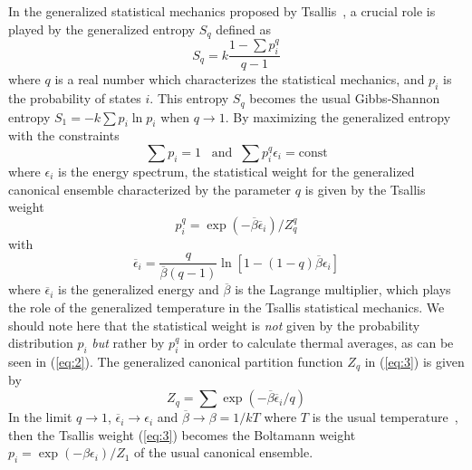 In the generalized statistical mechanics proposed by 
Tsallis~\cite{Ts}, a crucial role is played by the generalized 
entropy $S_{q}$ defined as 
\begin{equation}
S_{q}=k\frac{1-\sum p_{i}^{q}}{q-1}
\label{eq:1}
\end{equation}
where $q$ is a real number which characterizes the statistical 
mechanics, and $p_{i}$ is the probability of states $i$. This 
entropy $S_{q}$ becomes the usual Gibbs-Shannon entropy
$S_{1}=-k\sum p_{i}\ln p_{i}$ when $q\rightarrow 1$. By 
maximizing the generalized entropy with the constraints 
\begin{equation}
\sum p_{i}=1\;\;\;\mbox{and}\;\; \sum p_{i}^{q}\epsilon_{i}=\mbox{const} 
\label{eq:2}
\end{equation}
where $\epsilon_{i}$ is the energy spectrum, the statistical weight 
for the generalized canonical ensemble characterized by the 
parameter $q$ is given by the Tsallis weight
\begin{equation}
p_{i}^{q}=\exp\left(-\overline{\beta}\overline{\epsilon}_{i}\right)/Z_{q}^{q} 
\label{eq:3}
\end{equation}
with
\begin{equation}
\overline{\epsilon}_{i}=\frac{q}{\overline{\beta}(q-1)}
\ln\left[1-(1-q)\overline{\beta}\epsilon_{i }\right]
\label{eq:4}
\end{equation}
where $\overline{\epsilon}_{i}$ is the generalized energy and 
$\overline{\beta}$ is the Lagrange multiplier, which plays the
role of the generalized temperature in the Tsallis statistical
mechanics.  We should note here that the statistical weight is 
{\it not} given by the probability distribution $p_{i}$ {\it but} 
rather by $p_{i}^{q}$ in order to calculate thermal averages, as 
can be seen in (\ref{eq:2}). The generalized canonical partition 
function $Z_{q}$ in (\ref{eq:3}) is given by
\begin{equation}
Z_{q}=\sum \exp\left(-\overline{\beta}\overline{\epsilon}_{i}/q\right) 
\label{eq:5}
\end{equation}
In the limit $q\rightarrow 1$, $\overline{\epsilon}_{i}\rightarrow
\epsilon_{i}$
and $\overline{\beta}\rightarrow\beta=1/kT$ where $T$ is the usual 
temperature~\cite{CT}, then the Tsallis weight (\ref{eq:3}) becomes the 
Boltamann weight $p_{i}=\exp(-\beta\epsilon_{i})/Z_{1}$ of the usual 
canonical ensemble.


